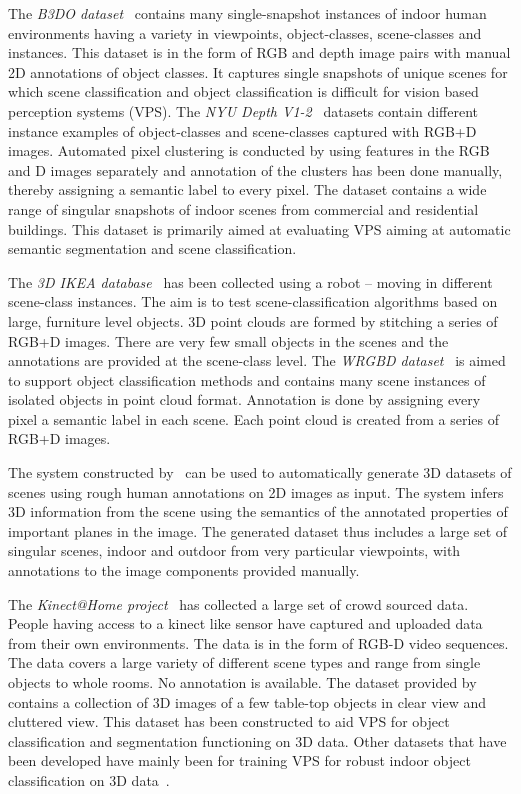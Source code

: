 \documentclass[letterpaper, 10 pt, conference]{ieeeconf}  %
\begin{document}
The \textit{B3DO dataset}~\cite{Janoch:ICCV2011} contains many
single-snapshot instances of indoor human environments having a
variety in viewpoints, object-classes, scene-classes and
instances. This dataset is in the form of RGB and depth image pairs
with manual 2D annotations of object classes. It captures single
snapshots of unique scenes for which scene classification and object
classification is difficult for vision based perception systems (VPS).
The \textit{NYU Depth V1-2}~\cite{Silberman:ECCV2012} datasets contain
different instance examples of object-classes and scene-classes
captured with RGB+D images. Automated pixel clustering is conducted by
using features in the RGB and D images separately and annotation of
the clusters has been done manually, thereby assigning a semantic
label to every pixel. The dataset contains a wide range of singular
snapshots of indoor scenes from commercial and residential
buildings. This dataset is primarily aimed at evaluating VPS aiming at
automatic semantic segmentation and scene classification.

The \textit{3D IKEA database}~\cite{Swadzba:RAS2012} has been collected using a robot -- moving in different scene-class instances. The 
aim is to test scene-classification algorithms based on large, furniture level objects. 3D point clouds are formed by 
stitching a series of RGB+D images. There are very few small objects in the scenes and the annotations are provided at the 
scene-class level. The \textit{WRGBD dataset}~\cite{Lai:ICRA2011} is aimed to support object classification methods and contains many scene 
instances of isolated objects in point cloud format. Annotation is done by assigning every pixel a semantic label in each scene. Each point 
cloud is created from a series of RGB+D images.

The system constructed by~\cite{Russell:CVPR2009} can be used to automatically generate 3D datasets of scenes using rough human annotations 
on 2D images as input. The system infers 3D information from the scene using the semantics of the annotated properties of important planes 
in the image. The generated dataset thus includes a large set of singular scenes, indoor and outdoor from very particular viewpoints, with 
annotations to the image components provided manually.

The \textit{Kinect@Home project}~\cite{Goransson13a} has collected a large set of crowd sourced data. People having access to a kinect like sensor 
have captured and uploaded data from their own environments. The data is in the form of RGB-D video sequences. The data covers a large 
variety of different scene types and range from single objects to whole rooms. No annotation is available.
The dataset provided by~\cite{Sun:ECCV2010} contains a collection of 3D images of a few table-top objects in clear view and cluttered view. 
This dataset has been constructed to aid VPS for object classification and segmentation functioning on 3D data. Other datasets that have 
been developed have mainly been for training VPS for robust indoor object classification on 3D data~\cite{WillowGarage:2011,Kimmel:ACCV2010}.
\end{document}
